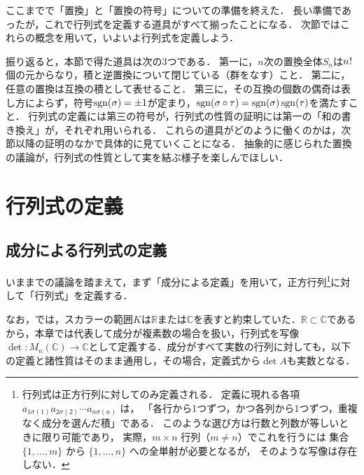 ここまでで「置換」と「置換の符号」についての準備を終えた．
長い準備であったが，これで行列式を定義する道具がすべて揃ったことになる．
次節ではこれらの概念を用いて，いよいよ行列式を定義しよう．

振り返ると，本節で得た道具は次の$3$つである．
第一に，$n$次の置換全体$S_n$は$n\mkern1mu!\mkern1mu$個の元からなり，積と逆置換について閉じている（群をなす）こと．
第二に，任意の置換は互換の積として表せること．
第三に，その互換の個数の偶奇は表し方によらず，符号$\operatorname{sgn}(\sigma) = \pm 1$が定まり，$\operatorname{sgn}(\sigma \circ \tau) = \operatorname{sgn}(\sigma)\operatorname{sgn}(\tau)$を満たすこと．
行列式の定義には第三の符号が，行列式の性質の証明には第一の「和の書き換え」が，それぞれ用いられる．
これらの道具がどのように働くのかは，次節以降の証明のなかで具体的に見ていくことになる．
抽象的に感じられた置換の議論が，行列式の性質として実を結ぶ様子を楽しんでほしい．

\section{行列式の定義}

\subsection{成分による行列式の定義}

いままでの議論を踏まえて，まず「成分による定義」を用いて，正方行列\footnote{行列式は正方行列に対してのみ定義される．
定義に現れる各項 $a_{1\sigma(1)} a_{2\sigma(2)} \dotsm a_{n\sigma(n)}$ は，
「各行から1つずつ，かつ各列から1つずつ，重複なく成分を選んだ積」である．
このような選び方は行数と列数が等しいときに限り可能であり，
実際，$m \times n$ 行列（$m \ne n$）でこれを行うには
集合 $\{1, \dots, m\}$ から $\{1, \dots, n\}$ への全単射が必要となるが，
そのような写像は存在しない．}に対して「行列式」を定義する．

なお，では，スカラーの範囲$K$は$\mathbb{R}$または$\mathbb{C}$を表すと約束していた．$\mathbb{R} \subset \mathbb{C}$であるから，本章では代表して成分が複素数の場合を扱い，行列式を写像$\det \colon M_n(\mathbb{C}) \to \mathbb{C}$として定義する．成分がすべて実数の行列に対しても，以下の定義と諸性質はそのまま通用し，その場合，定義式から$\det A$も実数となる．

